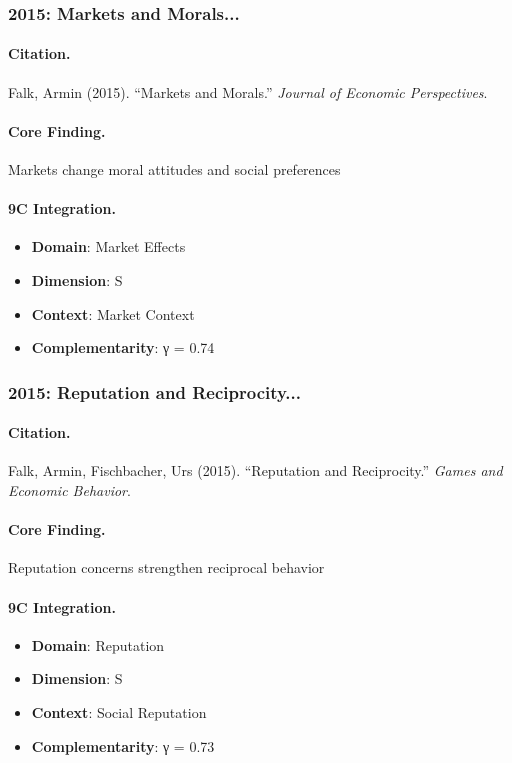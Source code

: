 \subsubsection{2015: Markets and Morals...}

\paragraph{Citation.}
Falk, Armin (2015). ``Markets and Morals.''
\textit{Journal of Economic Perspectives}.

\paragraph{Core Finding.}
Markets change moral attitudes and social preferences

\paragraph{9C Integration.}
\begin{itemize}[nosep]
  \item \textbf{Domain}: Market Effects
  \item \textbf{Dimension}: S
  \item \textbf{Context}: Market Context
  \item \textbf{Complementarity}: γ = 0.74
\end{itemize}


\subsubsection{2015: Reputation and Reciprocity...}

\paragraph{Citation.}
Falk, Armin, Fischbacher, Urs (2015). ``Reputation and Reciprocity.''
\textit{Games and Economic Behavior}.

\paragraph{Core Finding.}
Reputation concerns strengthen reciprocal behavior

\paragraph{9C Integration.}
\begin{itemize}[nosep]
  \item \textbf{Domain}: Reputation
  \item \textbf{Dimension}: S
  \item \textbf{Context}: Social Reputation
  \item \textbf{Complementarity}: γ = 0.73
\end{itemize}


